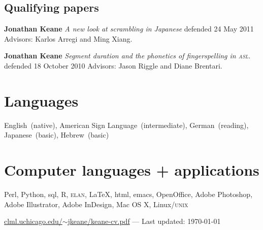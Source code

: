 \documentclass[10pt, letterpaper]{article}
\newcommand{\urltilde}{$\sim$}
\newcommand{\years}[1]{\marginpar{\scriptsize #1}}
\begin{document}
\vspace{2ex}
\subsection*{Qualifying papers}
\begin{hangparas}{1em}{1}
\-\years{2011} \textbf{Jonathan Keane} \textit{A new look at scrambling in Japanese} defended 24 May 2011 Advisors: Karlos Arregi and Ming Xiang. 

\-\years{2010} \textbf{Jonathan Keane} \textit{Segment duration and the phonetics of fingerspelling in \textsc{asl}.} defended 18 October 2010 Advisors: Jason Riggle and Diane Brentari. 
\end{hangparas}
%
%

\section*{Languages}
\label{sec:languages}
English~(native), American Sign Language~(intermediate), German~(reading), Japanese~(basic), Hebrew~(basic)

\section*{Computer languages + applications}
\label{sec:computer}
Perl, Python, {\sc sql}, R, \textsc{elan}, \LaTeX, {\sc html}, emacs, OpenOffice, Adobe Photoshop, Adobe Illustrator, Adobe InDesign, Mac OS X, Linux/\textsc{unix}

\vfill{}
\hrulefill
\begin{center}
{\footnotesize \href{http://clml.uchicago.edu/~jkeane/keane-cv.pdf}{clml.uchicago.edu/\urltilde{}jkeane/keane-cv.pdf} — Last updated: \isodate\today}
\end{center}
\end{document}
